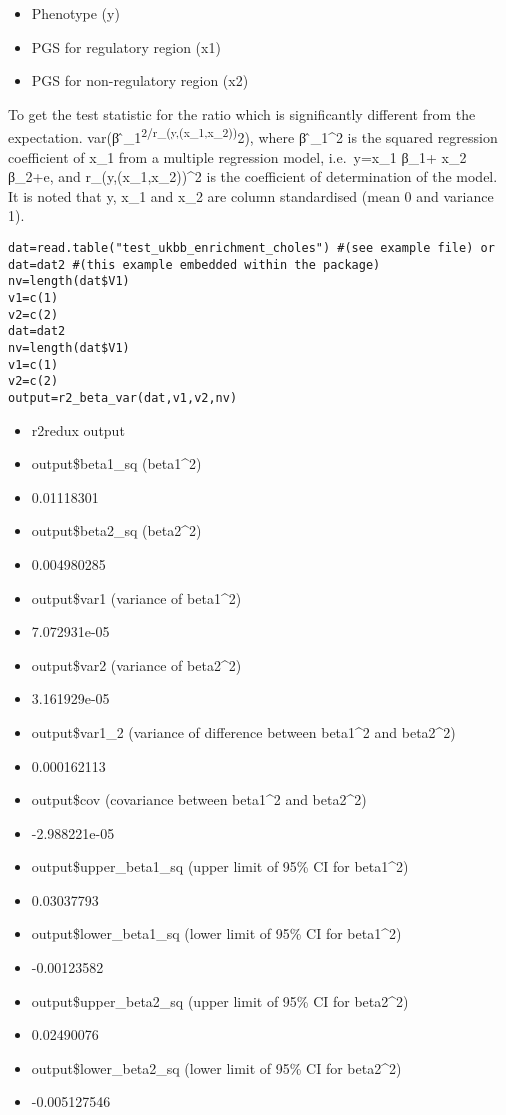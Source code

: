 \documentclass[
]{article}
\providecommand{\tightlist}{%
  \setlength{\itemsep}{0pt}\setlength{\parskip}{0pt}}
\begin{document}
\begin{itemize}
\tightlist
\item
  Phenotype (y)
\item
  PGS for regulatory region (x1)
\item
  PGS for non-regulatory region (x2)
\end{itemize}

To get the test statistic for the ratio which is significantly different
from the expectation. var(β ̂\_1\textsuperscript{2/r\_(y,(x\_1,x\_2))}2),
where β ̂\_1\^{}2 is the squared regression coefficient of x\_1 from a
multiple regression model, i.e.~y=x\_1 β\_1+ x\_2 β\_2+e, and
r\_(y,(x\_1,x\_2))\^{}2 is the coefficient of determination of the
model. It is noted that y, x\_1 and x\_2 are column standardised (mean 0
and variance 1).

\begin{verbatim}
dat=read.table("test_ukbb_enrichment_choles") #(see example file) or 
dat=dat2 #(this example embedded within the package)
nv=length(dat$V1)
v1=c(1)
v2=c(2)
dat=dat2
nv=length(dat$V1)
v1=c(1)
v2=c(2)
output=r2_beta_var(dat,v1,v2,nv)
\end{verbatim}

\begin{itemize}
\tightlist
\item
  r2redux output
\item
  output\$beta1\_sq (beta1\^{}2)
\item
  0.01118301
\item
  output\$beta2\_sq (beta2\^{}2)
\item
  0.004980285
\item
  output\$var1 (variance of beta1\^{}2)
\item
  7.072931e-05
\item
  output\$var2 (variance of beta2\^{}2)
\item
  3.161929e-05
\item
  output\$var1\_2 (variance of difference between beta1\^{}2 and
  beta2\^{}2)
\item
  0.000162113
\item
  output\$cov (covariance between beta1\^{}2 and beta2\^{}2)
\item
  -2.988221e-05
\item
  output\$upper\_beta1\_sq (upper limit of 95\% CI for beta1\^{}2)
\item
  0.03037793
\item
  output\$lower\_beta1\_sq (lower limit of 95\% CI for beta1\^{}2)
\item
  -0.00123582
\item
  output\$upper\_beta2\_sq (upper limit of 95\% CI for beta2\^{}2)
\item
  0.02490076
\item
  output\$lower\_beta2\_sq (lower limit of 95\% CI for beta2\^{}2)
\item
  -0.005127546
\end{itemize}
\end{document}
